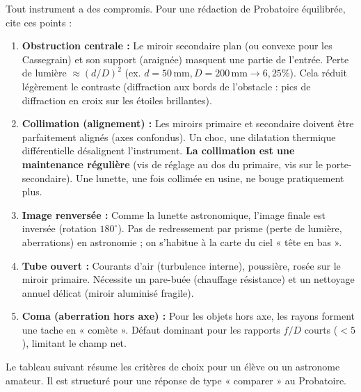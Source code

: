 \documentclass[11pt]{article}
\newcounter{popsec}
\newcounter{popsub}
\newcommand{\courssub}[1]{%
  \stepcounter{popsub}%
  \par\vspace{9pt}\noindent{\popxbold\fontsize{11.5}{13}\selectfont\color{popink}{\color{poporange}\thepopsec.\thepopsub}\hspace{6pt}#1}\par\nopagebreak\vspace{4pt}
}
\begin{document}
\begin{attention}
Tout instrument a des compromis. Pour une rédaction de Probatoire équilibrée, cite ces points :
\begin{enumerate}
    \item \textbf{Obstruction centrale :} Le miroir secondaire plan (ou convexe pour les Cassegrain) et son support (araignée) masquent une partie de l'entrée. Perte de lumière $\approx (d/D)^2$ (ex. $d=50\,\text{mm}, D=200\,\text{mm} \to 6,25\%$). Cela réduit légèrement le contraste (diffraction aux bords de l'obstacle : pics de diffraction en croix sur les étoiles brillantes).
    \item \textbf{Collimation (alignement) :} Les miroirs primaire et secondaire doivent être parfaitement alignés (axes confondus). Un choc, une dilatation thermique différentielle désalignent l'instrument. \textbf{La collimation est une maintenance régulière} (vis de réglage au dos du primaire, vis sur le porte-secondaire). Une lunette, une fois collimée en usine, ne bouge pratiquement plus.
    \item \textbf{Image renversée :} Comme la lunette astronomique, l'image finale est inversée (rotation $180^\circ$). Pas de redressement par prisme (perte de lumière, aberrations) en astronomie ; on s'habitue à la carte du ciel « tête en bas ».
    \item \textbf{Tube ouvert :} Courants d'air (turbulence interne), poussière, rosée sur le miroir primaire. Nécessite un pare-buée (chauffage résistance) et un nettoyage annuel délicat (miroir aluminisé fragile).
    \item \textbf{Coma (aberration hors axe) :} Pour les objets hors axe, les rayons forment une tache en « comète ». Défaut dominant pour les rapports $f/D$ courts ($< 5$), limitant le champ net.
\end{enumerate}
\end{attention}

\courssub{Bilan comparatif synthétique}

Le tableau suivant résume les critères de choix pour un élève ou un astronome amateur. Il est structuré pour une réponse de type « comparer » au Probatoire.
\end{document}
